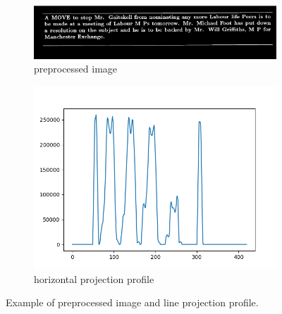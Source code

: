 \documentclass[english, paper=a4]{scrartcl}
\begin{document}
\begin{figure}[b!]
	\centering
	\begin{subfigure}[t!]{0.40\textwidth}
		\includegraphics[width=\textwidth]{PreprocessedImg.png}
		\caption{preprocessed image}
		\label{fig:ex2a}
	\end{subfigure}
	\begin{subfigure}[t!]{0.40\textwidth}
		\includegraphics[width=\textwidth]{HorzProjection.png}
		\caption{horizontal projection profile}
		\label{fig:ex2b}
	\end{subfigure}
	\caption{Example of preprocessed image and line projection profile.}
	\label{fig:ex_proj_horz}
\end{figure}
\end{document}
